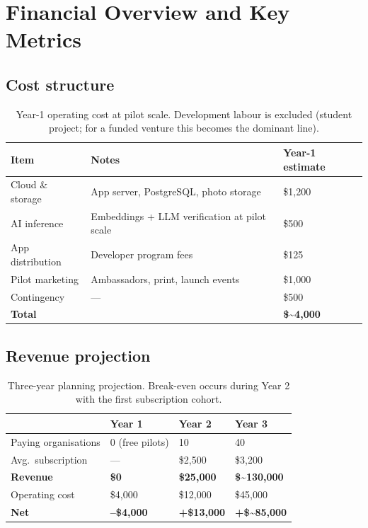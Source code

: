 \documentclass[11pt,a4paper]{article}
\begin{document}
\section{Financial Overview and Key Metrics}

\subsection{Cost structure}

\begin{table}[H]
\centering
\small
\renewcommand{\arraystretch}{1.3}
\begin{tabularx}{\textwidth}{l Y l}
\toprule
\textbf{Item} & \textbf{Notes} & \textbf{Year-1 estimate} \\
\midrule
Cloud \& storage & App server, PostgreSQL, photo storage & \$1{,}200 \\
AI inference & Embeddings + LLM verification at pilot scale & \$500 \\
App distribution & Developer program fees & \$125 \\
Pilot marketing & Ambassadors, print, launch events & \$1{,}000 \\
Contingency & --- & \$500 \\
\midrule
\textbf{Total} & & \textbf{\$\textasciitilde4{,}000} \\
\bottomrule
\end{tabularx}
\caption{Year-1 operating cost at pilot scale. Development labour is excluded (student
project; for a funded venture this becomes the dominant line).}
\end{table}

\subsection{Revenue projection}

\begin{table}[H]
\centering
\small
\renewcommand{\arraystretch}{1.3}
\begin{tabularx}{\textwidth}{l Y Y Y}
\toprule
 & \textbf{Year 1} & \textbf{Year 2} & \textbf{Year 3} \\
\midrule
Paying organisations & 0 (free pilots) & 10 & 40 \\
Avg.\ subscription & --- & \$2{,}500 & \$3{,}200 \\
\textbf{Revenue} & \textbf{\$0} & \textbf{\$25{,}000} & \textbf{\$\textasciitilde130{,}000} \\
Operating cost & \$4{,}000 & \$12{,}000 & \$45{,}000 \\
\textbf{Net} & \textbf{--\$4{,}000} & \textbf{+\$13{,}000} & \textbf{+\$\textasciitilde85{,}000} \\
\bottomrule
\end{tabularx}
\caption{Three-year planning projection. Break-even occurs during Year 2 with the first
subscription cohort.}
\end{table}
\end{document}
